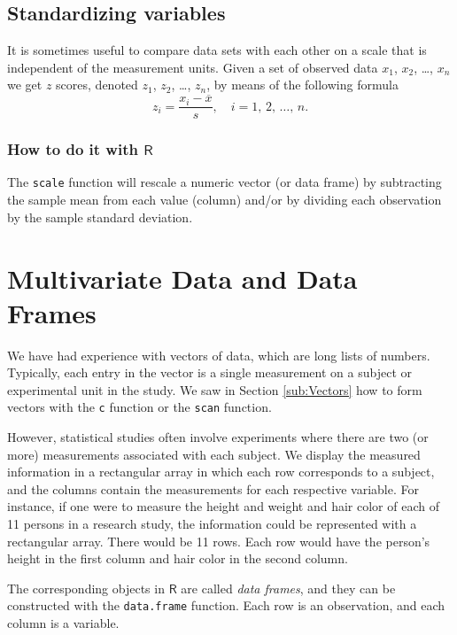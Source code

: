 \documentclass[captions=tableheading]{scrbook}
\begin{document}
\subsection{Standardizing variables}
\label{sec-2-4-5}


It is sometimes useful to compare data sets with each other on a scale that is independent of the measurement units. Given a set of observed data \(x_{1}\), \(x_{2}\), \ldots{}, \(x_{n}\) we get \(z\) scores, denoted \(z_{1}\), \(z_{2}\), \ldots{}, \(z_{n}\), by means of the following formula
\[
z_{i}=\frac{x_{i}-\overline{x}}{s},\quad i=1,\,2,\,\ldots,\, n.
\]
\subsubsection{How to do it with \(\mathsf{R}\)}
\label{sec-2-4-5-1}


The \texttt{scale} function will rescale a numeric vector (or data frame) by subtracting the sample mean from each value (column) and/or by dividing each observation by the sample standard deviation.
\section{Multivariate Data and Data Frames}
\label{sec-2-5}
\label{sec:multivariate-data}


We have had experience with vectors of data, which are long lists of numbers. Typically, each entry in the vector is a single measurement on a subject or experimental unit in the study. We saw in Section \ref{sub:Vectors} how to form vectors with the \texttt{c} function or the \texttt{scan} function. 

However, statistical studies often involve experiments where there are two (or more) measurements associated with each subject. We display the measured information in a rectangular array in which each row corresponds to a subject, and the columns contain the measurements for each respective variable. For instance, if one were to measure the height and weight and hair color of each of 11 persons in a research study, the information could be represented with a rectangular array. There would be 11 rows. Each row would have the person's height in the first column and hair color in the second column.

The corresponding objects in \(\mathsf{R}\) are called \emph{data frames}, and they can be constructed with the \texttt{data.frame} function. Each row is an observation, and each column is a variable.
\end{document}
